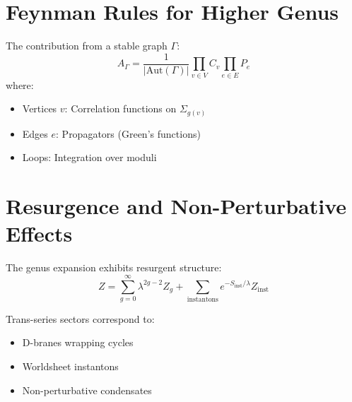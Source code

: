 \section{Feynman Rules for Higher Genus}

The contribution from a stable graph $\Gamma$:
$$A_{\Gamma} = \frac{1}{|\text{Aut}(\Gamma)|} \prod_{v \in V} C_v \prod_{e \in E} P_e$$
where:
\begin{itemize}
\item Vertices $v$: Correlation functions on $\Sigma_{g(v)}$
\item Edges $e$: Propagators (Green's functions)
\item Loops: Integration over moduli
\end{itemize}

\section{Resurgence and Non-Perturbative Effects}

The genus expansion exhibits resurgent structure:
$$Z = \sum_{g=0}^{\infty} \lambda^{2g-2} Z_g + \sum_{\text{instantons}} e^{-S_{\text{inst}}/\lambda} Z_{\text{inst}}$$

Trans-series sectors correspond to:
\begin{itemize}
\item D-branes wrapping cycles
\item Worldsheet instantons
\item Non-perturbative condensates
\end{itemize}
